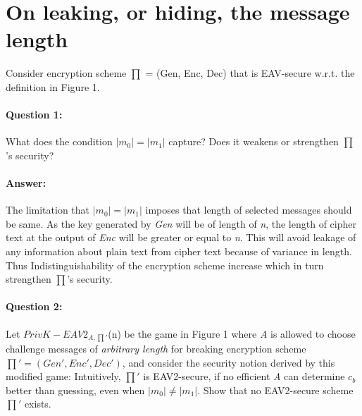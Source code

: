 \documentclass{article}
\begin{document}
\section{On leaking, or hiding, the message length}
    Consider encryption scheme $\prod$ = (Gen, Enc, Dec) that is EAV-secure w.r.t. the definition in Figure 1.
    
    \paragraph{Question 1:} What does the condition $|m_0| = |m_1|$ capture? Does it weakens or strengthen $\prod$'s security?
    \paragraph{Answer: \newline}
        The limitation that $|m_0| = |m_1|$ imposes that length of selected messages should be same. As the key generated by \emph{Gen} will be of length of \emph{n}, the length of cipher text at the output of \emph{Enc} will be greater or equal to \emph{n}. \newline
        This will avoid leakage of any information about plain text from cipher text because of variance in length. Thus Indistinguishability of the encryption scheme increase which in turn strengthen $\prod$'s security.
        
    \paragraph{Question 2:} Let $PrivK-EAV2_{A,\prod'}$(n) be the game in Figure 1 where \emph{A} is allowed to choose challenge messages of \emph{arbitrary length} for breaking encryption scheme $\prod' = (Gen',Enc',Dec')$, and consider the security notion derived by this modified game: Intuitively, $\prod'$ is EAV2-secure, if no efficient \emph{A} can determine $c_b$ better than guessing, even when $|m_0| \neq |m_1|$. Show that no EAV2-secure scheme $\prod'$ exists.
\end{document}
